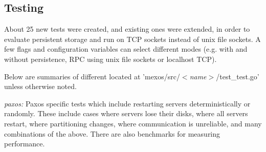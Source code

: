 \documentclass[letterpaper,10pt]{article}
\begin{document}





\subsection{Testing}
About 25 new tests were created, and existing ones were extended, in order to evaluate persistent storage and run on TCP sockets instead of unix file sockets.  A few flags and configuration variables can select different modes (e.g. with and without persistence, RPC using unix file sockets or localhost TCP).

Below are summaries of different located at 'mexos/src/\emph{$<$name$>$}/test\_test.go' unless otherwise noted.

\emph{paxos:} Paxos specific tests which include restarting servers deterministically or randomly.  These include cases where servers lose their disks, where all servers restart, where partitioning changes, where communication is unreliable, and many combinations of the above.  There are also benchmarks for measuring performance.
\end{document}

